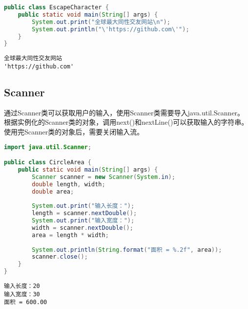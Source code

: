 
\begin{lstlisting}[language=Java]
public class EscapeCharacter {
	public static void main(String[] args) {
		System.out.print("全球最大同性交友网站\n");
		System.out.println("\'https://github.com\'");
	}
}
\end{lstlisting}

\begin{tcolorbox}
	\begin{verbatim}
全球最大同性交友网站
'https://github.com'
	\end{verbatim}
\end{tcolorbox}

\vspace{0.5cm}

\subsection{Scanner}

通过Scanner类可以获取用户的输入，使用Scanner类需要导入java.util.Scanner。根据实例化的Scanner类的对象，调用next()和nextLine()可以获取输入的字符串。\\

使用完Scanner类的对象后，需要关闭输入流。\\


\begin{lstlisting}[language=Java]
import java.util.Scanner;

public class CircleArea {
	public static void main(String[] args) {
		Scanner scanner = new Scanner(System.in);
		double length, width;
		double area;
		
		System.out.print("输入长度：");
		length = scanner.nextDouble();
		System.out.print("输入宽度：");
		width = scanner.nextDouble();
		area = length * width;
		
		System.out.println(String.format("面积 = %.2f", area));
		scanner.close();
	}
}
\end{lstlisting}

\begin{tcolorbox}
	\begin{verbatim}
输入长度：20
输入宽度：30
面积 = 600.00
	\end{verbatim}
\end{tcolorbox}

\vspace{0.5cm}

